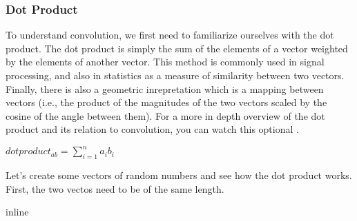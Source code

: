 \documentclass[letterpaper,10pt,english]{sphinxmanual}
\begin{document}
\subsubsection{Dot Product}
\label{\detokenize{content/Signal_Processing:dot-product}}
To understand convolution, we first need to familiarize ourselves with the dot product.  The dot product is simply the sum of the elements of a vector weighted by the elements of another vector. This method is commonly used in signal processing, and also in statistics as a measure of similarity between two vectors. Finally, there is also a geometric inrepretation which is a mapping between vectors (i.e., the product of the magnitudes of the two vectors scaled by the cosine of the angle between them). For a more in depth overview of the dot product and its relation to convolution, you can watch this optional .

\(dotproduct_{ab}=\sum\limits_{i=1}^n a_i b_i\)

Let’s create some vectors of random numbers and see how the dot product works.  First, the two vectos need to be of the same length.

\begin{sphinxVerbatim}[commandchars=\\\{\}]
 inline

   
   

  
  

 
 
 

  
\end{sphinxVerbatim}
\end{document}

